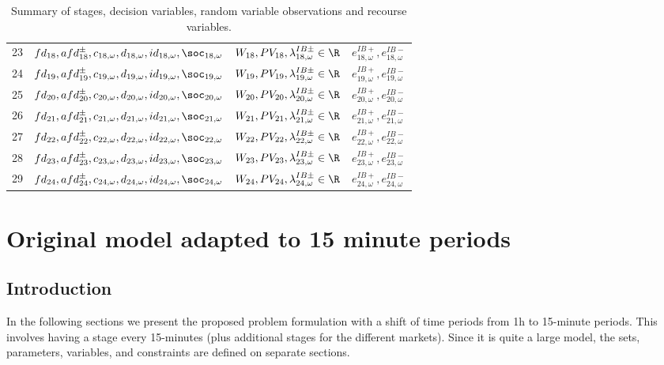 \begin{table}[H]
\begin{tabular}{c c c c}
	23& $fd_{18}, afd^{\pm}_{18}, c_{18, \omega}, d_{18, \omega}, id_{18, \omega}, \soc_{18, \omega}$ & $W_{18}, PV_{18}, \lambda^{IB\pm}_{18, \omega} \in \R$ &  $e^{IB+}_{18, \omega}, e^{IB-}_{18, \omega}$\\
	24& $fd_{19}, afd^{\pm}_{19}, c_{19, \omega}, d_{19, \omega}, id_{19, \omega}, \soc_{19, \omega}$ & $W_{19}, PV_{19}, \lambda^{IB\pm}_{19, \omega} \in \R$ & $e^{IB+}_{19, \omega}, e^{IB-}_{19, \omega}$\\
	25& $fd_{20}, afd^{\pm}_{20}, c_{20, \omega}, d_{20, \omega}, id_{20, \omega}, \soc_{20, \omega}$  & $W_{20}, PV_{20}, \lambda^{IB\pm}_{20, \omega} \in \R$ & $e^{IB+}_{20, \omega}, e^{IB-}_{20, \omega}$\\
	26&  $fd_{21}, afd^{\pm}_{21}, c_{21, \omega}, d_{21, \omega}, id_{21, \omega}, \soc_{21, \omega}$ & $W_{21}, PV_{21}, \lambda^{IB\pm}_{21, \omega} \in \R$ & $e^{IB+}_{21, \omega}, e^{IB-}_{21, \omega}$\\
	27& $fd_{22}, afd^{\pm}_{22}, c_{22, \omega}, d_{22, \omega}, id_{22, \omega}, \soc_{22, \omega}$ & $W_{22}, PV_{22}, \lambda^{IB\pm}_{22, \omega} \in \R$ & $e^{IB+}_{22, \omega}, e^{IB-}_{22, \omega}$\\
	28& $fd_{23}, afd^{\pm}_{23}, c_{23, \omega}, d_{23, \omega}, id_{23, \omega}, \soc_{23, \omega}$ & $W_{23}, PV_{23}, \lambda^{IB\pm}_{23, \omega} \in \R$ & $e^{IB+}_{23, \omega}, e^{IB-}_{23, \omega}$\\
	29& $fd_{24}, afd^{\pm}_{24}, c_{24, \omega}, d_{24, \omega}, id_{24, \omega}, \soc_{24, \omega}$ & $W_{24}, PV_{24}, \lambda^{IB\pm}_{24, \omega} \in \R$ & $e^{IB+}_{24, \omega}, e^{IB-}_{24, \omega}$\\
		
	
\end{tabular}
\caption{Summary of stages, decision variables, random variable observations and recourse variables.}
\label{TABLE:stages-rv-dv}
\end{table}

\section{Original model adapted to 15 minute periods}

\subsection{Introduction}

In the following sections we present the proposed problem formulation with a shift of time periods from 1h to 15-minute periods. This involves having a stage every 15-minutes (plus additional stages for the different markets). Since it is quite a large model, the sets, parameters, variables, and constraints are defined on separate sections.

